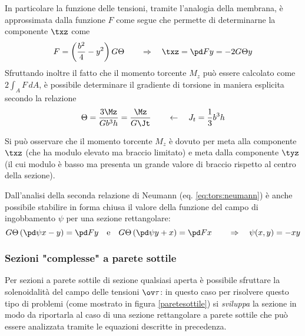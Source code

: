 		
		In particolare la funzione delle tensioni, tramite l'analogia della membrana, è approssimata dalla funzione $F$ come segue che permette di determinarne la componente $\txz$ come
		\[ F= \left( \frac{b^2}{4} - y^2\right) G\Theta \qquad \Rightarrow \quad \txz = \pd F y = -2G\Theta y  \]
		Sfruttando inoltre il fatto che il momento torcente $M_z$ può essere calcolato come $2\int_A F\, dA$, è possibile determinare il gradiente di torsione in maniera esplicita secondo la relazione
		\begin{equation}
			\Theta = \frac{3\Mz}{Gb^3 h} = \frac{\Mz}{G\Jt} \qquad \leftarrow \quad J_t = \frac 1 3 b^3h
		\end{equation}
		
		\begin{nota}
			Si può osservare che il momento torcente $M_z$ è dovuto per meta alla componente $\txz$ (che ha modulo elevato ma braccio limitato) e meta dalla componente $\tyz$ (il cui modulo è basso ma presenta un grande valore di braccio rispetto al centro della sezione).
		\end{nota}
    	Dall'analisi della seconda relazione di Neumann (eq. \ref{eq:tors:neumann}) è anche possibile stabilire in forma chiusa il valore della funzione del campo di ingobbamento $\psi$ per una sezione rettangolare:
    	\[ G\Theta \left( \pd \psi x - y\right) = \pd Fy \quad \textrm e \quad G\Theta\left(\pd \psi y+x\right) = \pd F x \qquad \Rightarrow \quad \psi(x,y) = -xy  \]
    	
    	\subsubsection{Sezioni "complesse" a parete sottile}
    		
    		Per sezioni a parete sottile di sezione qualsiasi aperta è possibile sfruttare la solenoidalità del campo delle tensioni $\ov \tau$: in questo caso per risolvere questo tipo di problemi (come mostrato in figura \ref{paretesottile}) si \textit{sviluppa} la sezione in modo da riportarla al caso di una sezione rettangolare a parete sottile che può essere analizzata tramite le equazioni descritte in precedenza.
    	
    	
